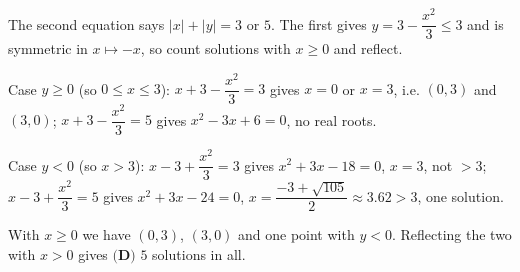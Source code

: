 The second equation says $|x|+|y|=3$ or $5$. The first gives $y=3-\dfrac{x^2}3\le3$ and is symmetric in $x\mapsto-x$, so count solutions with $x\ge0$ and reflect.

Case $y\ge0$ (so $0\le x\le3$): $x+3-\dfrac{x^2}3=3$ gives $x=0$ or $x=3$, i.e. $(0,3)$ and $(3,0)$; $x+3-\dfrac{x^2}3=5$ gives $x^2-3x+6=0$, no real roots.

Case $y<0$ (so $x>3$): $x-3+\dfrac{x^2}3=3$ gives $x^2+3x-18=0$, $x=3$, not $>3$; $x-3+\dfrac{x^2}3=5$ gives $x^2+3x-24=0$, $x=\dfrac{-3+\sqrt{105}}2\approx3.62>3$, one solution.

With $x\ge0$ we have $(0,3)$, $(3,0)$ and one point with $y<0$. Reflecting the two with $x>0$ gives $\boxed{\textbf{(D) }5}$ solutions in all.
